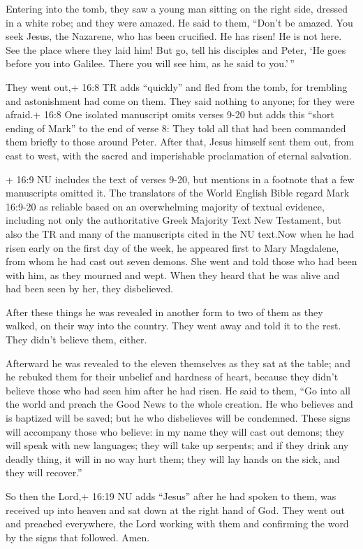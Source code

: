  Entering into the tomb, they saw a young man sitting on the
right side, dressed in a white robe; and they were amazed. 
He said to them, ``Don't be amazed. You seek Jesus, the Nazarene, who
has been crucified. He has risen! He is not here. See the place where
they laid him!  But go, tell his disciples and Peter, `He
goes before you into Galilee. There you will see him, as he said to
you.'\,''

 They went out,+ 16:8 TR adds ``quickly'' and fled from the
tomb, for trembling and astonishment had come on them. They said nothing
to anyone; for they were afraid.+ 16:8 One isolated manuscript omits
verses 9-20 but adds this ``short ending of Mark'' to the end of verse
8: They told all that had been commanded them briefly to those around
Peter. After that, Jesus himself sent them out, from east to west, with
the sacred and imperishable proclamation of eternal salvation.

 + 16:9 NU includes the text of verses 9-20, but mentions in
a footnote that a few manuscripts omitted it. The translators of the
World English Bible regard Mark 16:9-20 as reliable based on an
overwhelming majority of textual evidence, including not only the
authoritative Greek Majority Text New Testament, but also the TR and
many of the manuscripts cited in the NU text.Now when he had risen early
on the first day of the week, he appeared first to Mary Magdalene, from
whom he had cast out seven demons.  She went and told those
who had been with him, as they mourned and wept.  When they
heard that he was alive and had been seen by her, they disbelieved.

 After these things he was revealed in another form to two
of them as they walked, on their way into the country. 
They went away and told it to the rest. They didn't believe them,
either.

 Afterward he was revealed to the eleven themselves as they
sat at the table; and he rebuked them for their unbelief and hardness of
heart, because they didn't believe those who had seen him after he had
risen.  He said to them, ``Go into all the world and preach
the Good News to the whole creation.  He who believes and
is baptized will be saved; but he who disbelieves will be condemned.
 These signs will accompany those who believe: in my name
they will cast out demons; they will speak with new languages;
 they will take up serpents; and if they drink any deadly
thing, it will in no way hurt them; they will lay hands on the sick, and
they will recover.''

 So then the Lord,+ 16:19 NU adds ``Jesus'' after he had
spoken to them, was received up into heaven and sat down at the right
hand of God.  They went out and preached everywhere, the
Lord working with them and confirming the word by the signs that
followed. Amen.

